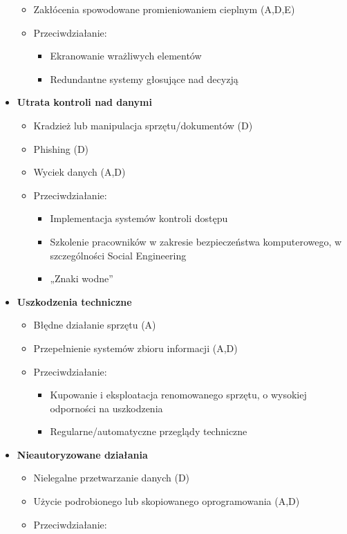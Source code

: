 \begin{itemize}
\begin{itemize}
		\item Zakłócenia spowodowane promieniowaniem cieplnym (A,D,E)
		\item Przeciwdziałanie:
		\begin{itemize}
			\item Ekranowanie wrażliwych elementów
			\item Redundantne systemy głosujące nad decyzją
		\end{itemize}
	\end{itemize}
	\item \textbf{Utrata kontroli nad danymi}
	\begin{itemize}
		\item Kradzież lub manipulacja sprzętu/dokumentów (D)
		\item Phishing (D)
		\item Wyciek danych (A,D)
		\item Przeciwdziałanie:
		\begin{itemize}
			\item Implementacja systemów kontroli dostępu
			\item Szkolenie pracowników w zakresie bezpieczeństwa komputerowego, w szczególności Social Engineering
			\item „Znaki wodne”
		\end{itemize}
	\end{itemize}
	\item \textbf{Uszkodzenia techniczne}
	\begin{itemize}
		\item Błędne działanie sprzętu (A)
		\item Przepełnienie systemów zbioru informacji (A,D)
		\item Przeciwdziałanie:
		\begin{itemize}
			\item Kupowanie i eksploatacja renomowanego sprzętu, o wysokiej odporności na uszkodzenia
			\item Regularne/automatyczne przeglądy techniczne
		\end{itemize}
	\end{itemize}
	\item \textbf{Nieautoryzowane działania}
	\begin{itemize}
		\item Nielegalne przetwarzanie danych (D)
		\item Użycie podrobionego lub skopiowanego oprogramowania (A,D)
		\item Przeciwdziałanie:
		\begin{itemize}

\end{itemize}
\end{itemize}
\end{itemize}

